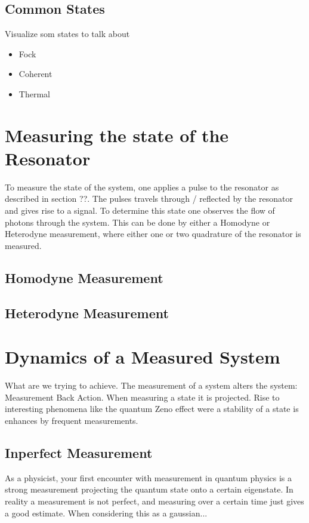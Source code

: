 \subsection{Common States}
Visualize som states to talk about
\begin{itemize}
    \item Fock
    \item Coherent
    \item Thermal
\end{itemize}


\section{Measuring the state of the Resonator}
To measure the state of the system, one applies a pulse to the resonator as described in section ??. The pulses travels through / reflected by the resonator and gives rise to a signal. To determine this state one observes the flow of photons through the system. This can be done by either a Homodyne or Heterodyne measurement, where either one or two quadrature of the resonator is measured. 

\subsection{Homodyne Measurement}


\subsection{Heterodyne Measurement}

\section{Dynamics of a Measured System}
What are we trying to achieve. The measurement of a system alters the system: Measurement Back Action. When measuring a state it is projected. Rise to interesting phenomena like the quantum Zeno effect were a stability of a state is enhances by frequent measurements. 

\subsection{Inperfect Measurement}
As a physicist, your first encounter with measurement in quantum physics is a strong measurement projecting the quantum state onto a certain eigenstate. In reality a measurement is not perfect, and measuring over a certain time just gives a good estimate. When considering this as a gaussian... 

